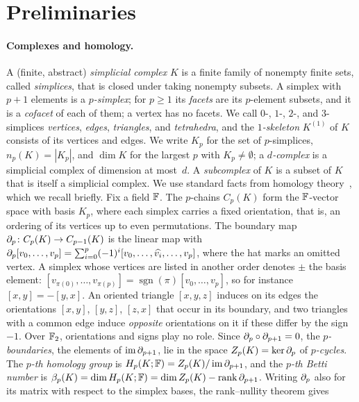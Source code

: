 \section{Preliminaries}\label{sec:prelim}

\paragraph{Complexes and homology.}
A (finite, abstract) \emph{simplicial complex} $K$ is a finite family of nonempty finite sets, called \emph{simplices}, that is closed under taking nonempty subsets.
A simplex with $p+1$ elements is a \emph{$p$-simplex}; for $p\ge1$ its \emph{facets} are its $p$-element subsets, and it is a \emph{cofacet} of each of them; a vertex has no facets.
We call $0$-, $1$-, $2$-, and $3$-simplices \emph{vertices}, \emph{edges}, \emph{triangles}, and \emph{tetrahedra}, and the \emph{$1$-skeleton} $K^{(1)}$ of $K$ consists of its vertices and edges.
We write $K_p$ for the set of $p$-simplices, $n_p(K)=|K_p|$, and $\dim K$ for the largest $p$ with $K_p\ne\emptyset$; a \emph{$d$-complex} is a simplicial complex of dimension at most~$d$.
A \emph{subcomplex} of $K$ is a subset of $K$ that is itself a simplicial complex.
We use standard facts from homology theory~\cite{Mun84,Hat02,EH10}, which we recall briefly.
Fix a field $\mathbb{F}$.
The $p$-chains $C_p(K)$ form the $\mathbb{F}$-vector space with basis $K_p$, where each simplex carries a fixed orientation, that is, an ordering of its vertices up to even permutations.
The boundary map $\partial_p\colon C_p(K)\to C_{p-1}(K)$ is the linear map with $\partial_p[v_0,\dots,v_p]=\sum_{i=0}^{p}(-1)^i[v_0,\dots,\widehat{v_i},\dots,v_p]$, where the hat marks an omitted vertex.
A simplex whose vertices are listed in another order denotes $\pm$ the basis element: $[v_{\pi(0)},\dots,v_{\pi(p)}]=\operatorname{sgn}(\pi)[v_0,\dots,v_p]$, so for instance $[x,y]=-[y,x]$.
An oriented triangle $[x,y,z]$ induces on its edges the orientations $[x,y]$, $[y,z]$, $[z,x]$ that occur in its boundary, and two triangles with a common edge induce \emph{opposite} orientations on it if these differ by the sign~$-1$.
Over $\mathbb{F}_2$, orientations and signs play no role.
Since $\partial_p\circ\partial_{p+1}=0$, the \emph{$p$-boundaries}, the elements of $\operatorname{im}\partial_{p+1}$, lie in the space $Z_p(K)=\ker\partial_p$ of \emph{$p$-cycles}.
The \emph{$p$-th homology group} is $H_p(K;\mathbb{F})=Z_p(K)/\operatorname{im}\partial_{p+1}$, and the \emph{$p$-th Betti number} is $\beta_p(K)=\dim H_p(K;\mathbb{F})=\dim Z_p(K)-\operatorname{rank}\partial_{p+1}$.
Writing $\partial_p$ also for its matrix with respect to the simplex bases, the rank--nullity theorem gives
